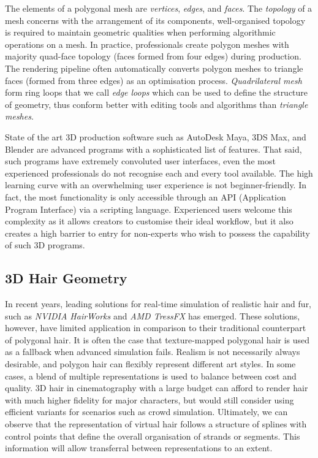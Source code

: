 \documentclass[ %
author={Dillon Keith Diep},
supervisor={Dr. Carl Henrik Ek},
degree={MEng},
title={ART-CG:},
subtitle={Assisted Real-time Content Generation of 3D Hair by Learning Manifolds},
type={Research},
year={2017} ]{dissertation}
\begin{document}
The elements of a polygonal mesh are \textit{vertices}, \textit{edges}, and \textit{faces}. The \textit{topology} of a mesh concerns with the arrangement of its components, well-organised topology is required to maintain geometric qualities when performing algorithmic operations on a mesh. In practice, professionals create polygon meshes with majority quad-face topology (faces formed from four edges) during production. The rendering pipeline often automatically converts polygon meshes to triangle faces (formed from three edges) as an optimisation process. \textit{Quadrilateral mesh} form ring loops that we call \textit{edge loops} which can be used to define the structure of geometry, thus conform better with editing tools and algorithms than \textit{triangle meshes}.

State of the art 3D production software such as AutoDesk Maya, 3DS Max, and Blender are advanced programs with a sophisticated list of features. That said, such programs have extremely convoluted user interfaces, even the most experienced professionals do not recognise each and every tool available. The high learning curve with an overwhelming user experience is not beginner-friendly. In fact, the most functionality is only accessible through an API (Application Program Interface) via a scripting language.  Experienced users welcome this complexity as it allows creators to customise their ideal workflow, but it also creates a high barrier to entry for non-experts who wish to possess the capability of such 3D programs.

\subsection{3D Hair Geometry}
In recent years, leading solutions for real-time simulation of realistic hair and fur, such as \textit{NVIDIA HairWorks} and \textit{AMD TressFX} has emerged. These solutions, however, have limited application in comparison to their traditional counterpart of polygonal hair. It is often the case that texture-mapped polygonal hair is used as a fallback when advanced simulation fails. Realism is not necessarily always desirable, and polygon hair can flexibly represent different art styles. In some cases, a blend of multiple representations is used to balance between cost and quality. 3D hair in cinematography with a large budget can afford to render hair with much higher fidelity for major characters, but would still consider using efficient variants for scenarios such as crowd simulation. Ultimately, we can observe that the representation of virtual hair follows a structure of splines with control points that define the overall organisation of strands or segments. This information will allow transferral between representations to an extent.
\end{document}
